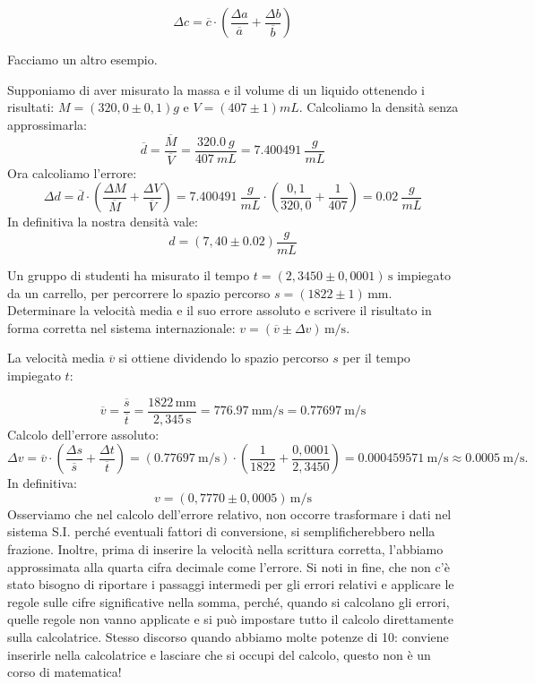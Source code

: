 \[
\Delta c = \overline{c} \cdot \left(\frac{\Delta a}{\overline{a}} + \frac{\Delta b}{\overline{b}}\right)
\] 


Facciamo un altro esempio.
\vspace{0.5 cm}
\begin{testexample}
Supponiamo di aver misurato la massa e il volume di un liquido ottenendo i risultati: $M=\left(320,0  \pm 0,1 \right)\si{g} $ e $V=\left(407 \pm 1 \right)\si{mL}$. Calcoliamo la densità senza approssimarla:
\[
\overline{d}=\frac{\overline{M}}{\overline{V}}=\frac{\SI{320,0}{g}}{\SI{407}{mL}}=\SI{7,400491}{\frac{g}{mL}}
\]
Ora calcoliamo l'errore:
\[
\Delta d = \overline{d}\cdot \left(\frac{\Delta M}{\overline{M}} +\frac{\Delta V}{\overline{V}}  \right)   = \SI{7,400491}{\frac{g}{mL}}\cdot\left(\frac{0,1}{320,0} +\frac{1}{407}  \right) =\SI{0,02}{\frac{g}{mL}}
\]
In definitiva la nostra densità vale:
\[
d=\left(7,40 \pm 0.02 \right)\si{\frac{g}{mL}}
\]
\end{testexample}


\begin{testexample}
Un gruppo di studenti ha misurato il tempo $t=\left(2,3450 \pm 0,0001\right)\,\si{\second}$ impiegato da un carrello, per percorrere  lo spazio percorso $s=\left(1822 \pm 1\right)\,\si{\milli\meter}$.  Determinare la velocità media e il suo errore assoluto e scrivere il risultato in forma corretta nel sistema internazionale: $v = \left( \overline{v} \pm \Delta v\right)\,\si{\meter\per\second}$.


La velocità media $\overline{v}$ si ottiene dividendo lo spazio percorso $s$ per il tempo impiegato $t$:

$$\overline{v} = \frac{\overline{s}}{\overline{t}} = \frac{1822\,\si{\milli\meter}}{2,345\,\si{\second}} = \SI{776,97}{\milli\meter\per\second} =  \SI{0,77697}{\meter\per\second}  $$
Calcolo dell'errore assoluto:
\[
\Delta v = \overline{v}\cdot \left(\frac{\Delta s}{\overline{s}} +\frac{\Delta t}{\overline{t}}  \right) =  \left( \SI{0,77697}{\meter\per\second}\right)\cdot \left(\frac{1}{1822} +\frac{0,0001}{2,3450}  \right) = \SI{0,000459571}{\meter\per\second} \approx \SI{0,0005}{\meter\per\second}.   
\]
In definitiva:
\[
v=\left(0,7770 \pm 0,0005\right) \, \si{\meter\per\second}
\]
Osserviamo che nel calcolo dell'errore relativo, non occorre trasformare i dati nel sistema S.I. perché eventuali fattori di conversione, si semplificherebbero nella frazione. Inoltre, prima di inserire la velocità nella scrittura corretta, l'abbiamo approssimata alla quarta cifra decimale come l'errore. Si noti in fine, che non c'è stato bisogno di riportare i passaggi intermedi per gli errori relativi e applicare le regole sulle cifre significative nella somma, perché, quando si calcolano gli errori, quelle regole non vanno applicate e si può impostare tutto il calcolo direttamente sulla calcolatrice. Stesso discorso quando abbiamo molte potenze di 10: conviene inserirle nella calcolatrice e lasciare che si occupi del calcolo, questo non è un corso di matematica!
 \end{testexample}

